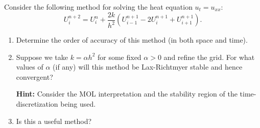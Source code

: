 

Consider the following method for solving the heat equation
$u_t=u_{xx}$:
\[
U_i^{n+2} = U_i^n + \frac{2k}{h^2}(U_{i-1}^{n+1} - 2U_i^{n+1} +
U_{i+1}^{n+1}).
\]
\begin{enumerate}
\item Determine the order of accuracy of this method (in both space and time).

\item Suppose we take $k=\alpha h^2$ for some fixed $\alpha>0$ and refine
the grid.  For what values of $\alpha$ (if any) will this method be
Lax-Richtmyer stable and hence convergent?  

{\bf Hint:} Consider the MOL interpretation and the stability region of
the time-discretization being used.

\item Is this a useful method?
\end{enumerate}

